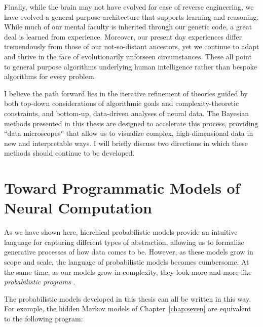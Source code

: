 Finally, while the brain may not have evolved for ease of reverse
engineering, we have evolved a general-purpose architecture that
supports learning and reasoning.  While much of our mental faculty is
inherited through our genetic code, a great deal is learned from
experience. Moreover, our present day experiences differ tremendously
from those of our not-so-distant ancestors, yet we continue to adapt
and thrive in the face of evolutionarily unforseen
circumstances. These all point to general purpose algorithms
underlying human intelligence rather than bespoke algorithms for
every problem.

I believe the path forward lies in the iterative refinement of
theories guided by both top-down considerations of algorithmic goals
and complexity-theoretic constraints, and bottom-up, data-driven
analyses of neural data. The Bayesian methods presented in this thesis
are designed to accelerate this process, providing ``data
microscopes'' that allow us to visualize complex, high-dimensional
data in new and interpretable ways. I will briefly discuss two
directions in which these methods should continue to be developed.

\section{Toward Programmatic Models of Neural Computation}
As we have
shown here, hierchical probabilistic models provide an intuitive
language for capturing different types of abstraction, allowing us to
formalize generative processes of how data comes to be. However, as
these models grow in scope and scale, the language of probabilistic
models becomes cumbersome. At the same time, as our models grow in
complexity, they look more and more like \emph{probabilistic
  programs} \citep{goodman2008church}.

The probabilistic models developed in this thesis can all be written in
this way. For example, the hidden Markov models of
Chapter~\ref{chap:seven} are equivalent to the following program:

